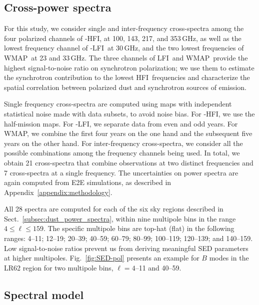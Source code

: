 \documentclass[longauth,traditabstract]{aa}
\newcommand{\WMAP}{WMAP}
\newcommand{\HFI}{HFI}
\newcommand{\LFI}{LFI}
\begin{document}
\subsection{Cross-power spectra}
\label{subsec:cross_spectra}

For this study, we consider single and inter-frequency cross-spectra among the four polarized channels 
of \Planck-HFI, at 100, 143, 217, and 353\,GHz, as well as the lowest frequency channel of \Planck-\LFI\ at 30\,GHz, and the two lowest frequencies of \WMAP\ at 23 and 33\,GHz. The three
channels of \LFI\ and \WMAP\ provide the highest signal-to-noise ratio on synchrotron polarization; we use them to estimate the synchrotron contribution to 
the lowest \HFI\ frequencies and characterize the spatial correlation between polarized dust and synchrotron sources of emission. 

Single frequency cross-spectra are computed using maps with independent statistical noise made with data subsets, to avoid noise bias. For \Planck-HFI, 
we use the half-mission maps. 
For \Planck-LFI, we separate data from even and odd years. 
For \WMAP, we combine the first four years on the one hand and the subsequent five years on the other hand. 
For inter-frequency cross-spectra, we consider all the possible combinations among the frequency channels being used. In total, we obtain 21 cross-spectra that combine observations at two distinct frequencies and 7 cross-spectra at a single frequency.  The uncertainties on power spectra are again computed from E2E simulations, as described in Appendix~\ref{appendix:methodology}. 

All 28 spectra are computed for each of the six sky regions described in Sect.~\ref{subsec:dust_power_spectra}, within nine multipole bins in the range $4\leq\ell\leq159$.  The specific multipole bins are top-hat (flat)
in the following ranges: 4--11; 12--19; 20--39; 40--59; 60--79; 80--99; 100--119; 120--139; and 140--159. 
Low signal-to-noise ratios prevent us from deriving meaningful SED parameters at higher multipoles.
Fig.~\ref{fig:SED-pol} presents an example for $B$ modes in the LR62 region for two multipole bins, $\ell = 4$--11 and 40--59.


\subsection{Spectral model}
\label{subsec:spectral_model}
\end{document}

